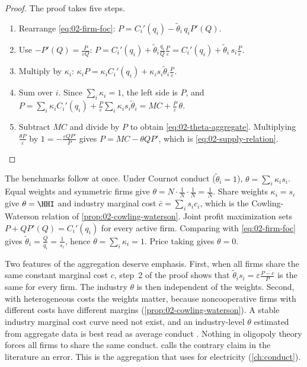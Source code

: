 \begin{proof}
The proof takes five steps.
\begin{enumerate}[label=\arabic*.]
\item Rearrange \eqref{eq:02-firm-foc}: $P = C_i'(q_i) - \tilde\theta_i\, q_i P'(Q)$.
\item Use $-P'(Q) = \frac{P}{\varepsilon Q}$: $P = C_i'(q_i) + \tilde\theta_i\frac{q_i}{Q}\frac{P}{\varepsilon}
  = C_i'(q_i) + \tilde\theta_i\, s_i\frac{P}{\varepsilon}$.
\item Multiply by $\kappa_i$: $\kappa_i P = \kappa_i C_i'(q_i) + \kappa_i s_i \tilde\theta_i\frac{P}{\varepsilon}$.
\item Sum over $i$. Since $\sum_i \kappa_i = 1$, the left side is $P$, and
  $P = \sum_i \kappa_i C_i'(q_i) + \frac{P}{\varepsilon}\sum_i \kappa_i s_i \tilde\theta_i = MC +
  \frac{P}{\varepsilon}\,\theta$.
\item Subtract $MC$ and divide by $P$ to obtain \eqref{eq:02-theta-aggregate}. Multiplying
  $\frac{\theta P}{\varepsilon}$ by $1 = -\frac{\varepsilon Q P'}{P}$ gives $P = MC - \theta Q P'$, which is
  \eqref{eq:02-supply-relation}. \qedhere
\end{enumerate}
\end{proof}

The benchmarks follow at once. Under Cournot conduct ($\tilde\theta_i = 1$), $\theta = \sum_i \kappa_i s_i$. Equal
weights and symmetric firms give $\theta = N \cdot \frac{1}{N}\cdot\frac{1}{N} = \frac{1}{N}$. Share weights
$\kappa_i = s_i$ give $\theta = \HHI$ and industry marginal cost $\bar c = \sum_i s_i c_i$, which is the
Cowling-Waterson relation of \cref{prop:02-cowling-waterson}. Joint profit maximization sets
$P + Q P'(Q) = C_i'(q_i)$ for every active firm. Comparing with \eqref{eq:02-firm-foc} gives
$\tilde\theta_i = \frac{Q}{q_i} = \frac{1}{s_i}$, hence $\theta = \sum_i \kappa_i = 1$. Price taking gives
$\theta = 0$.

Two features of the aggregation deserve emphasis. First, when all firms share the same constant marginal cost $c$,
step~2 of the proof shows that $\tilde\theta_i s_i = \varepsilon\frac{P - c}{P}$ is the same for every firm. The
industry $\theta$ is then independent of the weights. Second, with heterogeneous costs the weights matter, because
noncooperative firms with different costs have different margins (\cref{prop:02-cowling-waterson}). A stable industry
marginal cost curve need not exist, and an industry-level $\theta$ estimated from aggregate data is best read as
average conduct \citep[p.~1030]{Bresnahan1989}. Nothing in oligopoly theory forces all firms to share the same
conduct. \citet[p.~1030]{Bresnahan1989} calls the contrary claim in the literature an error. This is the aggregation
that \citet{Wolfram1999} uses for electricity (\cref{ch:conduct}).

